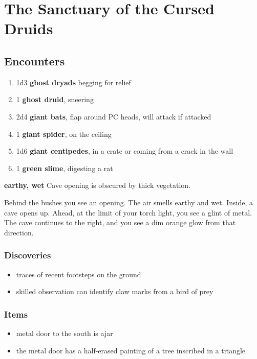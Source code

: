 \section{The Sanctuary of the Cursed Druids}

\subsection{Encounters}
\begin{enumerate}
	\item 1d3 \textbf{ghost dryads} begging for relief
	\item 1 \textbf{ghost druid}, sneering
	\item 2d4 \textbf{giant bats}, flap around PC heads, will attack if attacked
	\item 1 \textbf{giant spider}, on the ceiling
	\item 1d6 \textbf{giant centipedes}, in a crate or coming from a crack in
	      the wall
	\item 1 \textbf{green slime}, digesting a rat
\end{enumerate}

\textbf{earthy, wet}
Cave opening is obscured by thick vegetation.
\begin{DndReadAloud}
	Behind the bushes you see an opening. The air smells earthy and wet. Inside,
	a cave opens up. Ahead, at the limit of your torch light, you see a glint of
	metal. The cave continues to the right, and you see a dim orange glow from
	that direction.
\end{DndReadAloud}
\subsubsection{Discoveries}
\begin{itemize}
	\item traces of recent footsteps on the ground
	\item skilled observation can identify claw marks from a bird of prey
\end{itemize}
\subsubsection{Items}
\begin{itemize}
	\item metal door to the south is ajar
	\item the metal door has a half-erased painting of a tree inscribed in a triangle
\end{itemize}

